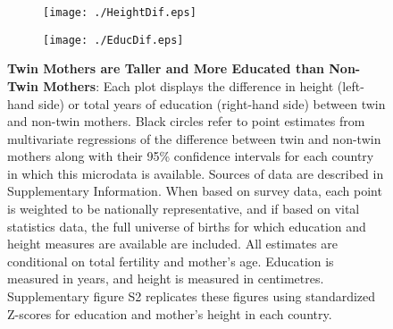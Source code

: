 \documentclass{nature}
\begin{document}
\begin{linenumbers}
\begin{spacing}{1}
\begin{figure}[htpb!]
\begin{subfigure}{.5\textwidth}
  \texttt{[image: ./HeightDif.eps]}
\end{subfigure}%
\begin{subfigure}{.5\textwidth}
  \texttt{[image: ./EducDif.eps]}
\end{subfigure}
\vspace{5mm}
\caption{\textbf{Twin Mothers are Taller and More Educated than Non-Twin Mothers}: {\footnotesize Each plot displays the difference in height (left-hand side) or total years of education (right-hand side) between twin and non-twin mothers.  Black circles refer to point estimates from multivariate regressions of the difference between twin and non-twin mothers along with their 95\% confidence intervals for each country in which this microdata is available.  Sources of data are described in Supplementary Information.  When based on survey data, each point is weighted to be nationally representative, and if based on vital statistics data, the full universe of births for which education and height measures are available are included.  All estimates are conditional on total fertility and mother's age. Education is measured in years, and height is measured in centimetres.  Supplementary figure S2 replicates these figures using standardized Z-scores for education and mother's height in each country.}}
\label{fig:countryEsts}
\end{figure}



\end{spacing}
\end{linenumbers}
\end{document}
